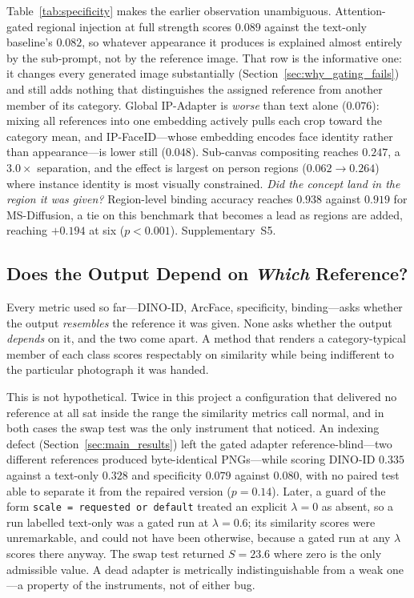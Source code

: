 \documentclass[review,10pt,times]{elsarticle}
\begin{document}
Table~\ref{tab:specificity} makes the earlier observation unambiguous.
Attention-gated regional injection at full strength scores $0.089$ against
the text-only baseline's $0.082$, so whatever appearance it produces is
explained almost entirely by the sub-prompt, not by the reference image.
That row is the informative one: it changes every generated image
substantially (Section~\ref{sec:why_gating_fails}) and still adds nothing
that distinguishes the assigned reference from another member of its
category.  Global
IP-Adapter is \emph{worse} than text alone ($0.076$): mixing all
references into one embedding actively pulls each crop toward the
category mean, and IP-FaceID---whose embedding encodes face identity
rather than appearance---is lower still ($0.048$).  Sub-canvas
compositing reaches $0.247$, a
$3.0\times$ separation, and the effect is largest on person regions
($0.062\!\to\!0.264$) where instance identity is most visually
constrained.
\noindent\textit{Did the concept land in the region it was given?}
Region-level binding accuracy reaches $0.938$ against $0.919$ for
MS-Diffusion, a tie on this benchmark that becomes a lead as regions are
added, reaching $+0.194$ at six ($p{<}0.001$).  Supplementary~S5.


\subsection{Does the Output Depend on \emph{Which} Reference?}
\label{sec:refresponse}

Every metric used so far---DINO-ID, ArcFace, specificity, binding---asks
whether the output \emph{resembles} the reference it was given.  None asks
whether the output \emph{depends} on it, and the two come apart.  A method
that renders a category-typical member of each class scores respectably on
similarity while being indifferent to the particular photograph it was
handed.

This is not hypothetical.  Twice in this project a configuration that
delivered no reference at all sat inside the range the similarity metrics
call normal, and in both cases the swap test was the only instrument that
noticed.  An indexing defect
(Section~\ref{sec:main_results}) left the gated adapter reference-blind---two
different references produced byte-identical PNGs---while scoring DINO-ID
$0.335$ against a text-only $0.328$ and specificity $0.079$ against $0.080$,
with no paired test able to separate it from the repaired version
($p{=}0.14$).  Later, a guard of the form \texttt{scale = requested or
default} treated an explicit $\lambda{=}0$ as absent, so a run labelled
text-only was a gated run at $\lambda{=}0.6$; its similarity scores were
unremarkable, and could not have been otherwise, because a gated run at any
$\lambda$ scores there anyway.  The swap test returned $S{=}23.6$ where zero
is the only admissible value.  A dead adapter is metrically indistinguishable
from a weak one---a property of the instruments, not of either bug.
\end{document}
